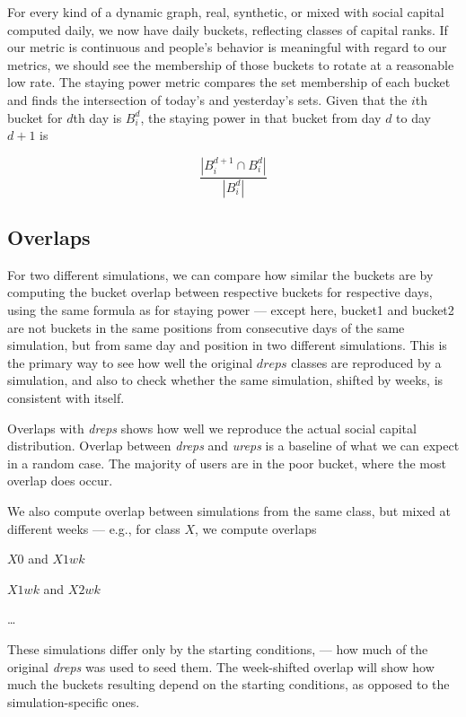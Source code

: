 \documentclass[10pt,oneside]{memoir}
\begin{document}
\label{sec:staying-power}
For every kind of a dynamic graph, real, synthetic, or mixed with social capital computed daily, we now have daily buckets, reflecting classes of capital ranks.  If our metric is continuous and people's behavior is meaningful with regard to our metrics, we should see the membership of those buckets to rotate at a reasonable low rate.  The staying power metric compares the set membership of each bucket and finds the intersection of today's and yesterday's sets.  Given that the $i$th bucket for $d$th day is $B_i^d$, the staying power in that bucket from day $d$ to day $d+1$ is

\[ \frac{|B_i^{d+1} \cap B_i^d|}{|B_i^d|} \]



\subsection{Overlaps}
\label{overlaps}

For two different simulations, we can compare how similar the buckets are by computing the bucket overlap between respective buckets for respective days, using the same formula as for staying power --- except here, bucket1 and bucket2 are not buckets in the same positions from consecutive days of the same simulation,  but from same day and position in two different simulations.  This is the primary way to see how well the original $dreps$ classes are reproduced by a simulation, and also to check whether the same simulation, shifted by weeks, is consistent with itself.


\label{sec:overx-dreps}
Overlaps with {\itshape dreps} shows how well we reproduce the actual social capital distribution.  Overlap between {\itshape dreps} and {\itshape ureps} is a baseline of what we can expect in a random case.  The majority of users are in the poor bucket, where the most overlap does occur.


\label{sec:overx-self}
We also compute overlap between simulations from the same class, but mixed at different weeks --- e.g., for class $X$, we compute overlaps


$X0$ and $X1wk$


$X1wk$ and $X2wk$


{\ldots}


These simulations differ only by the starting conditions, --- how much of the original {\itshape dreps} was used to seed them.  The week-shifted overlap will show how much the buckets resulting depend on the starting conditions, as opposed to the simulation-specific ones.
\end{document}
